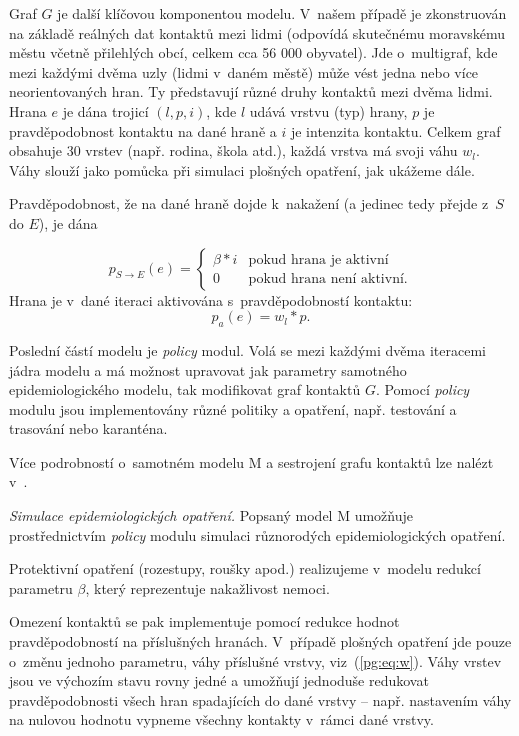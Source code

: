Graf $G$ je další klíčovou komponentou modelu. V~našem případě je
zkonstruován na základě reálných dat kontaktů mezi lidmi (odpovídá
skutečnému moravskému městu včetně přilehlých obcí, celkem cca 56 000
obyvatel). Jde o~multigraf, kde mezi každými dvěma uzly (lidmi v~daném
městě) může vést jedna nebo více neorientovaných hran. Ty představují
různé druhy kontaktů mezi dvěma lidmi. Hrana $e$ je dána trojicí $(l,
p, i)$, kde $l$ udává vrstvu (typ) hrany, $p$ je pravděpodobnost
kontaktu na dané hraně a $i$ je intenzita kontaktu. Celkem graf
obsahuje 30 vrstev (např. rodina, škola atd.), každá vrstva má svoji
váhu $w_l$. Váhy slouží jako pomůcka při simulaci plošných opatření,
jak ukážeme dále.

Pravděpodobnost, že na dané hraně dojde k~nakažení (a jedinec tedy přejde z~$S$
do $E$), je dána

\begin{equation}
  p_{S \rightarrow E}(e) = \begin{cases}
    \beta * i  & \mbox{pokud hrana je aktivní} \\
    0          & \mbox{pokud hrana není aktivní.} 
    \end{cases}
\end{equation}
Hrana je v~dané iteraci aktivována s~pravděpodobností kontaktu:
\begin{equation}
\label{pg:eq:w}
p_a(e) = w_l * p.
\end{equation}

Poslední částí modelu je {\em policy} modul. Volá se mezi každými dvěma
iteracemi jádra modelu a má možnost upravovat jak parametry samotného
epidemiologického modelu, tak modifikovat graf kontaktů $G$. Pomocí {\em policy} modulu
jsou implementovány různé politiky a opatření, např. testování a
trasování nebo karanténa. 

Více podrobností o~samotném modelu M a sestrojení grafu kontaktů lze nalézt v~\cite{M-techrep2021}.

\emph{Simulace epidemiologických opatření.} Popsaný model M umožňuje prostřednictvím {\em policy} modulu simulaci různorodých epidemiologických opatření.

Protektivní opatření (rozestupy, roušky apod.) realizujeme v~modelu
redukcí parametru $\beta$, který reprezentuje nakažlivost nemoci.

Omezení kontaktů se pak implementuje pomocí redukce hodnot
pravděpodobností na příslušných hranách. V~případě plošných opatření
jde pouze o~změnu jednoho parametru, váhy příslušné vrstvy,
viz~(\ref{pg:eq:w}). Váhy vrstev jsou ve výchozím stavu rovny jedné a
umožňují jednoduše redukovat pravděpodobnosti všech hran spadajících
do dané vrstvy --  např. nastavením váhy na nulovou hodnotu vypneme
všechny kontakty v~rámci dané vrstvy.

